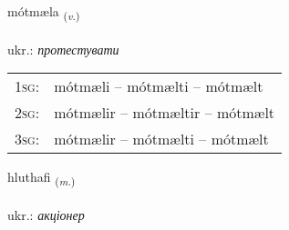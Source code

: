 \documentclass[frontgrid, backgrid]{flacards}\usepackage[]{graphicx}\usepackage[]{xcolor}
\begin{document}
\renewcommand{\flhead}{\vskip5pt \fboxsep=0pt {\small\bfseries\footnotesize Sagnorð | дієслово}}
\renewcommand{\fcfoot}{\vskip5pt \fboxsep=0pt \hspace{2pt}{\small\bfseries\footnotesize 2K}}

\renewcommand{\blhead}{\vskip5pt {\small\bfseries\footnotesize Sagnorð | дієслово }}
\renewcommand{\bcfoot}{\vskip5pt \hspace{2pt}{\small\bfseries\footnotesize 2K}}


{mótmæla \small{\textsubscript{(\textit{v.})}} \\[1ex] %
\textphonetic{[moutmaila]} \\
ukr.: \emph{протестувати} \\  [2ex]
\renewcommand*{\arraystretch}{0.8}
\begin{tabular}{p{1cm}l}
\textsc{1sg}: & mótmæli -- mótmælti -- mótmælt \\ 
\textsc{2sg}: & mótmælir -- mótmæltir -- mótmælt \\ 
\textsc{3sg}: & mótmælir -- mótmælti -- mótmælt \\ 
\end{tabular}
}

\renewcommand{\flhead}{\vskip5pt \fboxsep=0pt {\small\bfseries\footnotesize Nafnorð | іменник}}
\renewcommand{\fcfoot}{\vskip5pt \fboxsep=0pt \hspace{2pt}{\small\bfseries\footnotesize 2K}}

\renewcommand{\blhead}{\vskip5pt {\small\bfseries\footnotesize Nafnorð | іменник }}
\renewcommand{\bcfoot}{\vskip5pt \hspace{2pt}{\small\bfseries\footnotesize 2K}}


{hluthafi \small{\textsubscript{(\textit{m.})}} \\[1ex] %
\textphonetic{[l̥ʏːtavɪ]} \\
ukr.: \emph{акціонер} \\  [2ex]
\renewcommand*{\arraystretch}{0.8}
}
\end{document}
